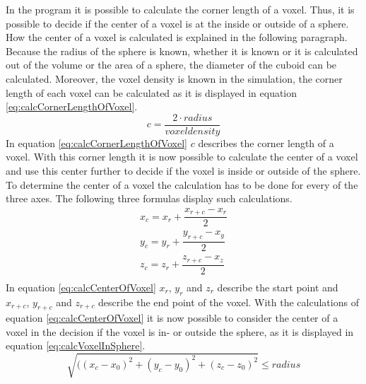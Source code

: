 In the program it is possible to calculate the corner length of a voxel. Thus, it is possible to decide if the center of a voxel is at the inside or outside of a sphere. How the center of a voxel is calculated is explained in the following paragraph. \newline
Because the radius of the sphere is known, whether it is known or it is calculated out of the volume or the area of a sphere, the diameter of the cuboid can be calculated. Moreover, the voxel density is known in the simulation, the corner length of each voxel can be calculated as it is displayed in equation \ref{eq:calcCornerLengthOfVoxel}.
\begin{equation}\label{eq:calcCornerLengthOfVoxel}
c = \dfrac{2 \cdot radius}{voxel density}
\end{equation}
In equation \ref{eq:calcCornerLengthOfVoxel} $c$ describes the corner length of a voxel. With this corner length it is now possible to calculate the center of a voxel and use this center further to decide if the voxel is inside or outside of the sphere. To determine the center of a voxel the calculation has to be done for every of the three axes. The following three formulas display such calculations. 
\begin{equation}\label{eq:calcCenterOfVoxel}
\begin{split}
x_{c} = x_{r} + \dfrac{x_{r+c} - x_{r}}{2} \\
y_{c} = y_{r} + \dfrac{y_{r+c} - x_{y}}{2} \\
z_{c} = z_{r} + \dfrac{z_{r+c} - x_{z}}{2} \\
\end{split}
\end{equation}
In equation \ref{eq:calcCenterOfVoxel} $x_{r}$, $y_{r}$ and $z_{r}$ describe the start point and $x_{r+c}$, $y_{r+c}$ and $z_{r+c}$ describe the end point of the voxel.
With the calculations of equation \ref{eq:calcCenterOfVoxel} it is now possible to consider the center of a voxel in the decision if the voxel is in- or outside the sphere, as it is displayed in equation \ref{eq:calcVoxelInSphere}.
\begin{equation}\label{eq:calcVoxelInSphere}
\sqrt{((x_{c} - x_{0})^{2} + (y_{c} - y_{0})^{2} + (z_{c} -z_{0})^{2}} \leq radius
\end{equation}



